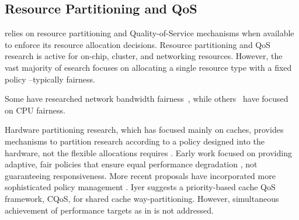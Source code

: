 \subsection{Resource Partitioning and QoS}
\label{sec:rel:pm}


\pacora relies on resource partitioning and Quality-of-Service mechanisms when available to enforce its resource allocation decisions.  Resource partitioning and QoS research is active for on-chip, cluster, and networking resources.  However, the vast majority of esearch focuses on allocating a single resource type with a fixed policy --typically fairness.

Some have researched network bandwidth fairness~\cite{Blanquer, Kleinberg99fairnessin, Liu}, while others~\cite{Baruah96proportionateprogress, Baruah_fastscheduling, Zhu} have focused on CPU fairness. 

Hardware partitioning research, which has focused mainly on caches, provides mechanisms to partition research according to a policy designed into the hardware, not the flexible allocations \pacora requires \cite{876484, 967444,1194855,1275005,1194858,1318096,1088154,1399973,1069998,1399982} .  Early work focused on providing adaptive, fair policies that ensure equal performance degradation \cite{605420,1086328}, not guaranteeing responsiveness. More recent proposals have incorporated more sophisticated policy management \cite{1241608,1331730,1152161,1254886}. Iyer\cite{1006246} suggests a priority-based cache QoS framework, CQoS, for shared cache way-partitioning. 
However, simultaneous achievement of performance targets as in \pacora is not addressed.







